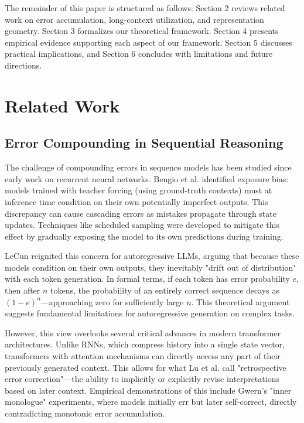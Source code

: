 \documentclass{article}
\begin{document}
The remainder of this paper is structured as follows: Section 2 reviews related work on error accumulation, long-context utilization, and representation geometry. Section 3 formalizes our theoretical framework. Section 4 presents empirical evidence supporting each aspect of our framework. Section 5 discusses practical implications, and Section 6 concludes with limitations and future directions.

\section{Related Work}

\subsection{Error Compounding in Sequential Reasoning}

The challenge of compounding errors in sequence models has been studied since early work on recurrent neural networks. Bengio et al. \citep{bengio2015scheduled} identified exposure bias: models trained with teacher forcing (using ground-truth contexts) must at inference time condition on their own potentially imperfect outputs. This discrepancy can cause cascading errors as mistakes propagate through state updates. Techniques like scheduled sampling were developed to mitigate this effect by gradually exposing the model to its own predictions during training.

LeCun \citep{lecun2023why} reignited this concern for autoregressive LLMs, arguing that because these models condition on their own outputs, they inevitably "drift out of distribution" with each token generation. In formal terms, if each token has error probability $e$, then after $n$ tokens, the probability of an entirely correct sequence decays as $(1-e)^n$—approaching zero for sufficiently large $n$. This theoretical argument suggests fundamental limitations for autoregressive generation on complex tasks.

However, this view overlooks several critical advances in modern transformer architectures. Unlike RNNs, which compress history into a single state vector, transformers with attention mechanisms can directly access any part of their previously generated context. This allows for what Lu et al. \citep{lu2022self} call "retrospective error correction"—the ability to implicitly or explicitly revise interpretations based on later context. Empirical demonstrations of this include Gwern's \citep{gwern2023inner} "inner monologue" experiments, where models initially err but later self-correct, directly contradicting monotonic error accumulation.
\end{document}
